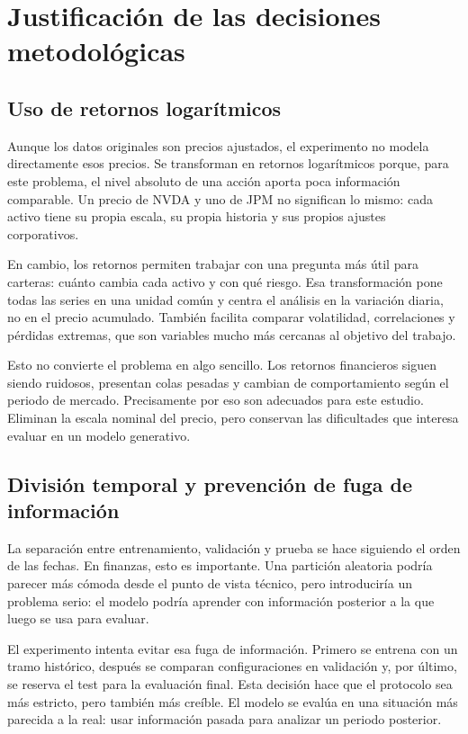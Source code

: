 \documentclass[11pt,a4paper,spanish,oneside]{book}
\numberwithin{equation}{chapter}
\numberwithin{figure}{chapter}
\begin{document}
\section{Justificación de las decisiones metodológicas}

\subsection{Uso de retornos logarítmicos}

Aunque los datos originales son precios ajustados, el experimento no modela directamente esos precios. Se transforman en retornos logarítmicos porque, para este problema, el nivel absoluto de una acción aporta poca información comparable. Un precio de NVDA y uno de JPM no significan lo mismo: cada activo tiene su propia escala, su propia historia y sus propios ajustes corporativos.

En cambio, los retornos permiten trabajar con una pregunta más útil para carteras: cuánto cambia cada activo y con qué riesgo. Esa transformación pone todas las series en una unidad común y centra el análisis en la variación diaria, no en el precio acumulado. También facilita comparar volatilidad, correlaciones y pérdidas extremas, que son variables mucho más cercanas al objetivo del trabajo.

Esto no convierte el problema en algo sencillo. Los retornos financieros siguen siendo ruidosos, presentan colas pesadas y cambian de comportamiento según el periodo de mercado. Precisamente por eso son adecuados para este estudio. Eliminan la escala nominal del precio, pero conservan las dificultades que interesa evaluar en un modelo generativo.

\subsection{División temporal y prevención de fuga de información}

La separación entre entrenamiento, validación y prueba se hace siguiendo el orden de las fechas. En finanzas, esto es importante. Una partición aleatoria podría parecer más cómoda desde el punto de vista técnico, pero introduciría un problema serio: el modelo podría aprender con información posterior a la que luego se usa para evaluar.

El experimento intenta evitar esa fuga de información. Primero se entrena con un tramo histórico, después se comparan configuraciones en validación y, por último, se reserva el test para la evaluación final. Esta decisión hace que el protocolo sea más estricto, pero también más creíble. El modelo se evalúa en una situación más parecida a la real: usar información pasada para analizar un periodo posterior.
\end{document}
